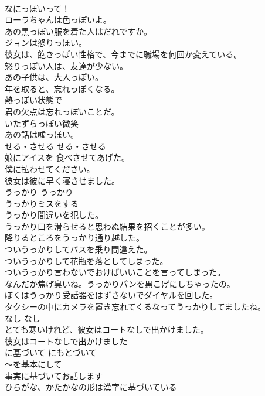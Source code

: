 \documentclass[8pt]{extreport}
\begin{document}
\begin{CJK}{UTF8}{min}
\\	なにっぽいって！  
\\	ローラちゃんは色っぽいよ。  
\\	あの黒っぽい服を着た人はだれですか。  
\\	ジョンは怒りっぽい。   
\\	彼女は、飽きっぽい性格で、今までに職場を何回か変えている。   
\\	怒りっぽい人は、友達が少ない。  
\\	あの子供は、大人っぽい。   
\\	年を取ると、忘れっぽくなる。  
\\	熱っぽい状態で   
\\	君の欠点は忘れっぽいことだ。   
\\	いたずらっぽい微笑   
\\	あの話は嘘っぽい。  
\\	せる・させる	せる・させる	
\\	娘にアイスを 食べさせてあげた。  
\\	僕に払わせてください。  
\\	彼女は彼に早く寝させました。  
\\	うっかり	うっかり	
\\	うっかりミスをする  
\\	うっかり間違いを犯した。   
\\	うっかり口を滑らせると思わぬ結果を招くことが多い。   
\\	降りるところをうっかり通り越した。  
\\	ついうっかりしてバスを乗り間違えた。   
\\	ついうっかりして花瓶を落としてしまった。   
\\	ついうっかり言わないでおけばいいことを言ってしまった。   
\\	なんだか焦げ臭いね。うっかりパンを黒こげにしちゃったの。   
\\	ぼくはうっかり受話器をはずさないでダイヤルを回した。   
\\	タクシーの中にカメラを置き忘れてくるなってうっかりしてましたね。   
\\	なし	なし	
\\	とても寒いけれど、彼女はコートなしで出かけました。  
\\	彼女はコートなしで出かけました   
\\	に基づいて	にもとづいて	
\\	〜を基本にして	
\\	事実に基づいてお話します  
\\	ひらがな、かたかなの形は漢字に基づいている  

\end{CJK}
\end{document}
